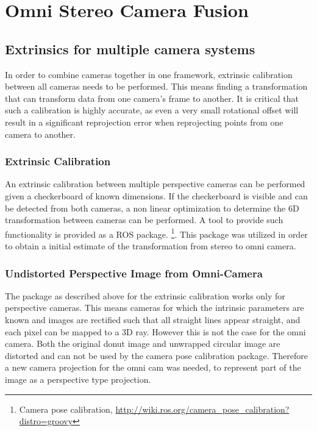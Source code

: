 \chapter{Omni Stereo Camera Fusion}
\label{chapter:omni_stereo_fusion}

\section{Extrinsics for multiple camera systems}

In order to combine cameras together in one framework, extrinsic calibration between all cameras needs to be performed.  This means finding a transformation that can transform data from one camera's frame to another.  It is critical that such a calibration is highly accurate, as even a very small rotational offset will result in a significant reprojection error when reprojecting points from one camera to another.

\subsection{Extrinsic Calibration}


An extrinsic calibration between multiple perspective cameras can be performed given a checkerboard of known dimensions.  If the checkerboard is visible and can be detected from both cameras, a non linear optimization to determine the 6D transformation between cameras can be performed.  A tool to provide such functionality is provided as a ROS package. \footnote{Camera pose calibration, \url{http://wiki.ros.org/camera_pose_calibration?distro=groovy}}.  This package was utilized in order to obtain a initial estimate of the transformation from stereo to omni camera.


\subsection{Undistorted Perspective Image from Omni-Camera}

The package as described above for the extrinsic calibration works only for perspective cameras. This means cameras for which the intrinsic parameters are known and images are rectified such that all straight lines appear straight, and each pixel can be mapped to a 3D ray.  However this is not the case for the omni camera.  Both the original donut image and unwrapped circular image are distorted and can not be used by the camera pose calibration package.  Therefore a new camera projection for the omni cam was needed, to represent part of the image as a perspective type projection.

